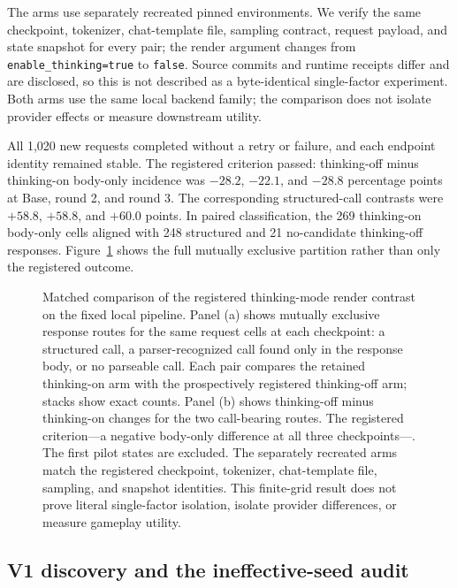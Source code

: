 \documentclass[10pt]{article}
\begin{document}
The arms use separately recreated pinned environments. We verify the same
checkpoint, tokenizer, chat-template file, sampling contract, request payload,
and state snapshot for every pair; the render argument changes from
\texttt{enable\_thinking=true} to \texttt{false}. Source commits and runtime
receipts differ and are disclosed, so this is not described as a byte-identical
single-factor experiment. Both arms use the same local backend family; the
comparison does not isolate provider effects or measure downstream utility.

All 1,020 new requests completed without a retry or failure, and each endpoint
identity remained stable. The registered criterion passed: thinking-off minus
thinking-on body-only incidence was $-28.2$, $-22.1$, and $-28.8$ percentage
points at Base, round 2, and round 3. The corresponding structured-call
contrasts were $+58.8$, $+58.8$, and $+60.0$ points. In paired classification,
the 269 thinking-on body-only cells aligned with 248 structured and 21
no-candidate thinking-off responses. Figure~\ref{fig:thinking-parity}
shows the full mutually exclusive partition rather than only the registered
outcome.

\begin{figure}[t]
\centering
\ServingRegimeParityFigure
\caption{Matched comparison of the registered thinking-mode render contrast on
the fixed local pipeline. Panel (a) shows mutually exclusive response routes for
the same \ParityRequestsPerCheckpoint{} request cells at each checkpoint: a
structured call, a parser-recognized call found only in the response body, or
no parseable call. Each pair compares the retained thinking-on arm with the
prospectively registered thinking-off arm; stacks show exact counts. Panel (b)
shows thinking-off minus thinking-on changes for the two call-bearing routes.
The registered criterion---a negative body-only difference at all three
checkpoints---\ParityDirectionalVerdict{}. The first
\ParityExcludedPilotStates{} pilot states are excluded. The separately
recreated arms match the registered checkpoint, tokenizer, chat-template file,
sampling, and snapshot identities. This finite-grid result does not prove
literal single-factor isolation, isolate provider differences, or measure
gameplay utility.}
\label{fig:thinking-parity}
\end{figure}

\subsection{V1 discovery and the ineffective-seed audit}
\end{document}
